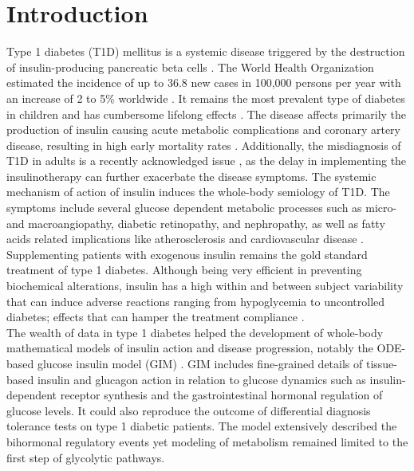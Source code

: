\newpage
\section{Introduction}
Type 1 diabetes (T1D) mellitus is a systemic disease triggered by the destruction of insulin-producing pancreatic beta cells \cite{maahs2010epidemiology}. The World Health Organization estimated the incidence of up to 36.8 new cases in 100,000 persons per year with an increase of 2 to 5\% worldwide \cite{maahs2010epidemiology}. It remains the most prevalent type of diabetes in children and has cumbersome lifelong effects \cite{maahs2010epidemiology}. The disease affects primarily the production of insulin causing acute metabolic complications and coronary artery disease, resulting in high early mortality rates \cite{orchard2006type}. Additionally, the misdiagnosis of T1D in adults is a recently acknowledged issue \cite{thomas2017frequency}, as the delay in implementing the insulinotherapy can further exacerbate the disease symptoms.
The systemic mechanism of action of insulin induces the whole-body semiology of T1D. The symptoms include several glucose dependent metabolic processes such as micro- and macroangiopathy, diabetic retinopathy, and nephropathy, as well as fatty acids related implications like atherosclerosis and cardiovascular disease \cite{american2014diagnosis}. Supplementing patients with exogenous insulin remains the gold standard treatment of type 1 diabetes. Although being  very efficient in preventing biochemical alterations, insulin has a high within and between subject variability that can induce adverse reactions ranging from hypoglycemia to uncontrolled diabetes; effects that can hamper the treatment compliance \cite{heinemann2002variability}.\\
The wealth of data in type 1 diabetes helped the development of whole-body mathematical models of insulin action and disease progression, notably the ODE-based glucose insulin model (GIM) \cite{schaller2013generic}. GIM includes fine-grained details of tissue-based insulin and glucagon action in relation to glucose dynamics such as insulin-dependent receptor synthesis and the gastrointestinal hormonal regulation of glucose levels. It could also reproduce the outcome of differential diagnosis tolerance tests on type 1 diabetic patients. The model extensively described the bihormonal regulatory events yet modeling of metabolism remained limited to the first step of glycolytic pathways.\\

